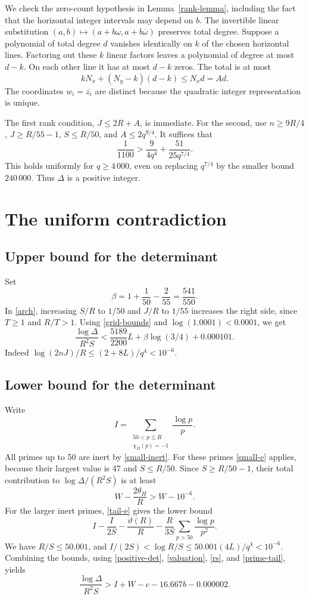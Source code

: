 \documentclass[11pt]{article}
\begin{document}
We check the zero-count hypothesis in Lemma~\ref{rank-lemma}, including
the fact that the horizontal integer intervals may depend on \(b\).
The invertible linear substitution
\((a,b)\mapsto(a+b\omega,a+b\overline\omega)\) preserves total degree.
Suppose a polynomial of total degree \(d\) vanishes identically on
\(k\) of the chosen horizontal lines. Factoring out these \(k\)
linear factors leaves a polynomial of degree at most \(d-k\).
On each other line it has at most \(d-k\) zeros. The total is at most
\[
 kN_x+(N_y-k)(d-k)\le N_xd=Ad.
\]
The coordinates \(w_i=\overline{z_i}\) are distinct because the
quadratic integer representation is unique.

The first rank condition, \(J\le2R+A\), is immediate.
For the second, use \(n\ge9R/4\), \(J\ge R/55-1\),
\(S\le R/50\), and \(A\le2q^{9/4}\). It suffices that
\[
 \frac1{1100}>
 \frac{9}{4q^4}+\frac{51}{25q^{7/4}}.
\]
This holds uniformly for \(q\ge4\,000\), even on replacing
\(q^{7/4}\) by the smaller bound \(240\,000\).
Thus \(\Delta\) is a positive integer.

\section{The uniform contradiction}\label{contradiction}

\subsection{Upper bound for the determinant}

Set
\[
 \beta=1+\frac1{50}-\frac2{55}=\frac{541}{550}.
\]
In \eqref{arch}, increasing \(S/R\) to \(1/50\) and \(J/R\) to
\(1/55\) increases the right side, since \(T\ge1\) and \(R/T>1\).
Using \eqref{grid-bounds} and \(\log(1.0001)<0.0001\), we get
\begin{equation}\label{arch-final}
 \frac{\log\Delta}{R^2S}
 <\frac{5189}{2200}L+\beta\log(3/4)+0.000101.
\end{equation}
Indeed \(\log(2nJ)/R\le(2+8L)/q^4<10^{-6}\).

\subsection{Lower bound for the determinant}

Write
\[
 I=\sum_{\substack{50<p\le R\\\chi_D(p)=-1}}\frac{\log p}{p}.
\]
All primes up to 50 are inert by \eqref{small-inert}.
For these primes \eqref{small-e} applies, because their largest value
is 47 and \(S\le R/50\). Since \(S\ge R/50-1\), their total
contribution to \(\log\Delta/(R^2S)\) is at least
\[
 W-\frac{2\theta_H}{R}>W-10^{-6}.
\]
For the larger inert primes, \eqref{tail-e} gives the lower bound
\[
 I-\frac{I}{2S}-\frac{\vartheta(R)}R
       -\frac{R}{3S}\sum_{p>50}\frac{\log p}{p^2}.
\]
We have \(R/S\le50.001\), and
\(I/(2S)<\log R/S\le50.001(4L)/q^4<10^{-6}\).
Combining the bounds, using \eqref{positive-det}, \eqref{valuation},
\eqref{rs}, and \eqref{prime-tail}, yields
\begin{equation}\label{padic-final}
 \frac{\log\Delta}{R^2S}
 >I+W-c-16.667b-0.000002.
\end{equation}
\end{document}
